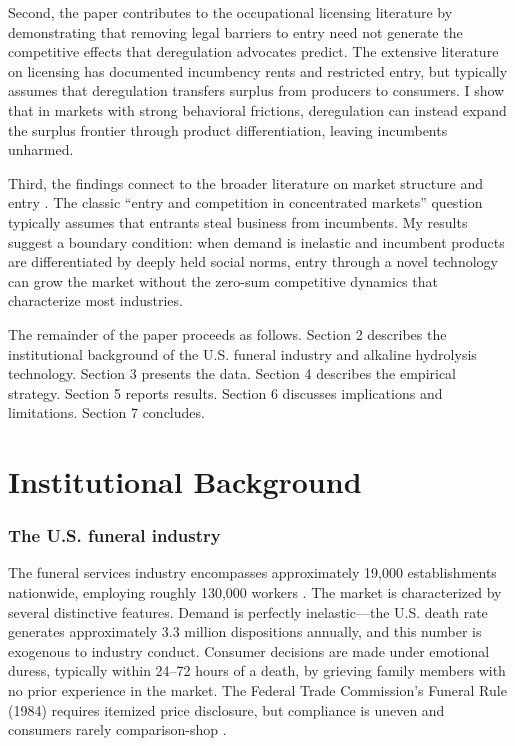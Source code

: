 \documentclass[12pt]{article}
\begin{document}
Second, the paper contributes to the occupational licensing literature by demonstrating that removing legal barriers to entry need not generate the competitive effects that deregulation advocates predict. The extensive literature on licensing \citep{kleiner2006licensing, kleiner2013analyzing} has documented incumbency rents and restricted entry, but typically assumes that deregulation transfers surplus from producers to consumers. I show that in markets with strong behavioral frictions, deregulation can instead expand the surplus frontier through product differentiation, leaving incumbents unharmed.

Third, the findings connect to the broader literature on market structure and entry \citep{bresnahan1991entry, berry1992estimation}. The classic ``entry and competition in concentrated markets'' question typically assumes that entrants steal business from incumbents. My results suggest a boundary condition: when demand is inelastic and incumbent products are differentiated by deeply held social norms, entry through a novel technology can grow the market without the zero-sum competitive dynamics that characterize most industries.

The remainder of the paper proceeds as follows. Section 2 describes the institutional background of the U.S. funeral industry and alkaline hydrolysis technology. Section 3 presents the data. Section 4 describes the empirical strategy. Section 5 reports results. Section 6 discusses implications and limitations. Section 7 concludes.


\section{Institutional Background}

\subsubsection*{The U.S. funeral industry} The funeral services industry encompasses approximately 19,000 establishments nationwide, employing roughly 130,000 workers \citep{nfda2023statistics}. The market is characterized by several distinctive features. Demand is perfectly inelastic---the U.S. death rate generates approximately 3.3 million dispositions annually, and this number is exogenous to industry conduct. Consumer decisions are made under emotional duress, typically within 24--72 hours of a death, by grieving family members with no prior experience in the market. The Federal Trade Commission's Funeral Rule (1984) requires itemized price disclosure, but compliance is uneven and consumers rarely comparison-shop \citep{kosar2021understanding, harrington2007effects}.
\end{document}
